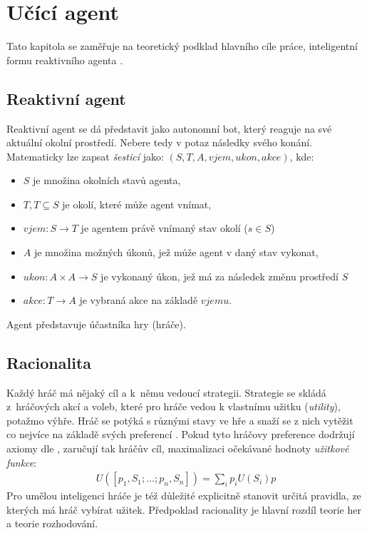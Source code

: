 \chapter{Učící agent}
Tato kapitola se zaměřuje na teoretický podklad hlavního cíle práce, inteligentní formu reaktivního agenta \cite{AI3}.
\section{Reaktivní agent}
Reaktivní agent \cite{AI3} se dá představit jako autonomní bot, který reaguje na své aktuální okolní prostředí. Nebere tedy v potaz následky svého konání. Matematicky lze zapsat \textit{šesticí} \cite{AI3} jako: $(S,T,A, vjem, ukon, akce)$, kde:
\begin{itemize}
\item $S$ je množina okolních stavů agenta,
\item $T, T\subseteq S$ je okolí, které může agent vnímat,
\item $vjem: S \to T$ je agentem právě vnímaný stav okolí ($s \in S$)
\item $A$ je množina možných úkonů, jež může agent v daný stav vykonat,
\item $ukon: A \times A \to S$ je vykonaný úkon, jež má za následek změnu prostředí $S$
\item $akce: T \to A$ je vybraná akce na základě $vjemu$.
\end{itemize}
Agent představuje účastníka hry (hráče).

\section{Racionalita}
\label{sec:racionalita}
Každý hráč má nějaký cíl a k němu vedoucí strategii. Strategie se skládá z hráčových akcí a voleb, které pro hráče vedou k vlastnímu užitku (\textit{utility}), potažmo výhře. Hráč se potýká s různými stavy ve hře a snaží se z nich vytěžit co nejvíce na základě svých preferencí \cite{berkeley}. Pokud tyto hráčovy preference dodržují axiomy dle \cite{mas}, zaručují tak hráčův cíl, maximalizaci očekávané hodnoty \textit{užitkové funkce}:
\begin{align}
U([p_1,S_1;\dots;p_n,S_n]) = \sum_{i}p_iU(S_i)p
\end{align}
Pro umělou inteligenci hráče je též důležité explicitně stanovit určitá pravidla, ze kterých má hráč vybírat užitek. Předpoklad racionality je hlavní rozdíl teorie her a teorie rozhodování.

